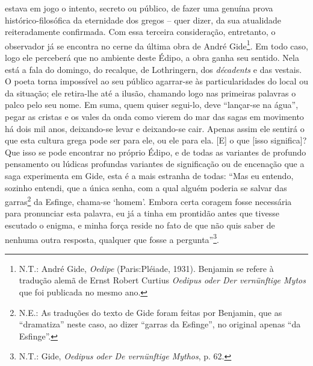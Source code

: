 estava em jogo o intento, secreto ou público, de fazer uma genuína prova
histórico-filosófica da eternidade dos gregos -- quer dizer, da sua
atualidade reiteradamente confirmada. Com essa terceira consideração,
entretanto, o observador já se encontra no cerne da última obra de André
Gide\footnote{N.T.: André Gide, \emph{Oedipe} (Paris:Pléiade, 1931).
  Benjamin se refere à tradução alemã de Ernst Robert Curtius
  \emph{Oedipus oder Der vernünftige Mytos} que foi publicada no mesmo
  ano.}. Em todo caso, logo ele perceberá que no ambiente deste Édipo, a
obra ganha seu sentido. Nela está a fala do domingo, do recalque, de
Lothringern, dos \emph{décadents} e das vestais. O poeta torna
impossível ao seu público agarrar-se às particularidades do local ou da
situação; ele retira-lhe até a ilusão, chamando logo nas primeiras
palavras o palco pelo seu nome. Em suma, quem quiser segui-lo, deve
``lançar-se na água'', pegar as cristas e os vales da onda como vierem
do mar das sagas em movimento há dois mil anos, deixando-se levar e
deixando-se cair. Apenas assim ele sentirá o que esta cultura grega pode
ser para ele, ou ele para ela. {[}E{]} o que {[}isso significa{]}? Que
isso se pode encontrar no próprio Édipo, e de todas as variantes de
profundo pensamento ou lúdicas profundas variantes de significação ou de
encenação que a saga experimenta em Gide, esta é a mais estranha de
todas: ``Mas eu entendo, sozinho entendi, que a única senha, com a qual
alguém poderia se salvar das garras\footnote{N.E.: As traduções do texto
  de Gide foram feitas por Benjamin, que as ``dramatiza'' neste caso, ao
  dizer ``garras da Esfinge'', no original apenas ``da Esfinge''.} da
Esfinge, chama-se `homem'. Embora certa coragem fosse necessária para
pronunciar esta palavra, eu já a tinha em prontidão antes que tivesse
escutado o enigma, e minha força reside no fato de que não quis saber de
nenhuma outra resposta, qualquer que fosse a pergunta''\footnote{N.T.:
  Gide, \emph{Oedipus oder De vernünftige Mythos}, p. 62.}.

